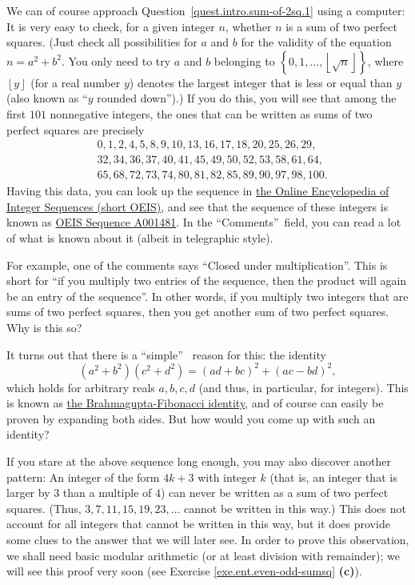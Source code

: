 \documentclass[numbers=enddot,12pt,final,onecolumn,notitlepage]{scrartcl}%
\numberwithin{exer}{subsection}
\theoremstyle{definition}
\begin{document}
We can of course approach Question~\ref{quest.intro.sum-of-2sq.1} using a
computer: It is very easy to check, for a given integer $n$, whether $n$ is a
sum of two perfect squares. (Just check all possibilities for $a$ and $b$ for
the validity of the equation $n=a^{2}+b^{2}$. You only need to try $a$ and $b$
belonging to $\left\{  0,1,\ldots,\left\lfloor \sqrt{n}\right\rfloor \right\}
$, where $\left\lfloor y\right\rfloor $ (for a real number $y$) denotes the
largest integer that is less or equal than $y$ (also known as
\textquotedblleft$y$ rounded down\textquotedblright).) If you do this, you
will see that among the first $101$ nonnegative integers, the ones that can be
written as sums of two perfect squares are precisely
\begin{align*}
&  0,1,2,4,5,8,9,10,13,16,17,18,20,25,26,29,\\
&  32,34,36,37,40,41,45,49,50,52,53,58,61,64,\\
&  65,68,72,73,74,80,81,82,85,89,90,97,98,100.
\end{align*}
Having this data, you can look up the sequence in \href{https://oeis.org/}{the
Online Encyclopedia of Integer Sequences (short OEIS)}, and see that the
sequence of these integers is known as \href{https://oeis.org/A001481}{OEIS
Sequence A001481}. In the \textquotedblleft Comments\textquotedblright\ field,
you can read a lot of what is known about it (albeit in telegraphic style).

For example, one of the comments says ``Closed under multiplication''. This is
short for ``if you multiply two entries of the sequence, then the product will
again be an entry of the sequence''. In other words, if you multiply two
integers that are sums of two perfect squares, then you get another sum of two
perfect squares. Why is this so?

It turns out that there is a \textquotedblleft simple\textquotedblright%
\ reason for this: the identity
\begin{equation}
\left(  a^{2}+b^{2}\right)  \left(  c^{2}+d^{2}\right)  =\left(  ad+bc\right)
^{2}+\left(  ac-bd\right)  ^{2}, \label{eq.intro.sum-of-2sq.sum*sum}%
\end{equation}
which holds for arbitrary reals $a,b,c,d$ (and thus, in particular, for
integers). This is known as
\href{https://en.wikipedia.org/wiki/Brahmagupta-Fibonacci_identity}{the
Brahmagupta-Fibonacci identity}, and of course can easily be proven by
expanding both sides. But how would you come up with such an identity?

If you stare at the above sequence long enough, you may also discover another
pattern: An integer of the form $4k+3$ with integer $k$ (that is, an integer
that is larger by $3$ than a multiple of $4$) can never be written as a sum of
two perfect squares. (Thus, $3,7,11,15,19,23,\ldots$ cannot be written in this
way.) This does not account for all integers that cannot be written in this
way, but it does provide some clues to the answer that we will later see. In
order to prove this observation, we shall need basic modular arithmetic (or at
least division with remainder); we will see this proof very soon (see Exercise
\ref{exe.ent.even-odd-sumsq} \textbf{(c)}).
\end{document}

